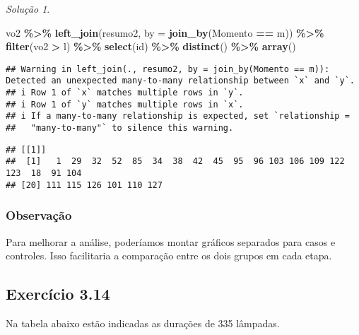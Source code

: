 \documentclass[
]{latex/krantz}
\newenvironment{Shaded}{\begin{snugshade}}{\end{snugshade}}
\newcommand{\AttributeTok}[1]{\textcolor[rgb]{0.13,0.29,0.53}{#1}}
\newcommand{\FunctionTok}[1]{\textcolor[rgb]{0.13,0.29,0.53}{\textbf{#1}}}
\newcommand{\NormalTok}[1]{#1}
\newcommand{\SpecialCharTok}[1]{\textcolor[rgb]{0.81,0.36,0.00}{\textbf{#1}}}
\theoremstyle{definition}
\theoremstyle{definition}
\theoremstyle{definition}
\theoremstyle{definition}
\theoremstyle{remark}
\newtheorem*{solution}{Solução}
\begin{document}
\begin{solution}
\begin{Shaded}
\begin{Highlighting}[]
\NormalTok{vo2 }\SpecialCharTok{\%\textgreater{}\%}
  \FunctionTok{left\_join}\NormalTok{(resumo2, }\AttributeTok{by =} \FunctionTok{join\_by}\NormalTok{(Momento }\SpecialCharTok{==}\NormalTok{ m)) }\SpecialCharTok{\%\textgreater{}\%}
  \FunctionTok{filter}\NormalTok{(vo2 }\SpecialCharTok{\textgreater{}}\NormalTok{ l) }\SpecialCharTok{\%\textgreater{}\%}
  \FunctionTok{select}\NormalTok{(id) }\SpecialCharTok{\%\textgreater{}\%}
  \FunctionTok{distinct}\NormalTok{() }\SpecialCharTok{\%\textgreater{}\%}
  \FunctionTok{array}\NormalTok{()}
\end{Highlighting}
\end{Shaded}

\begin{verbatim}
## Warning in left_join(., resumo2, by = join_by(Momento == m)): Detected an unexpected many-to-many relationship between `x` and `y`.
## i Row 1 of `x` matches multiple rows in `y`.
## i Row 1 of `y` matches multiple rows in `x`.
## i If a many-to-many relationship is expected, set `relationship =
##   "many-to-many"` to silence this warning.
\end{verbatim}

\begin{verbatim}
## [[1]]
##  [1]   1  29  32  52  85  34  38  42  45  95  96 103 106 109 122 123  18  91 104
## [20] 111 115 126 101 110 127
\end{verbatim}

\hypertarget{observauxe7uxe3o}{%
\subsubsection*{Observação}\label{observauxe7uxe3o}}

Para melhorar a análise, poderíamos montar gráficos separados para casos e controles. Isso facilitaria a comparação entre os dois grupos em cada etapa.

\end{solution}

\hypertarget{exr3-14}{%
\subsection*{Exercício 3.14}\label{exr3-14}}

Na tabela abaixo estão indicadas as durações de 335 lâmpadas.
\end{document}
